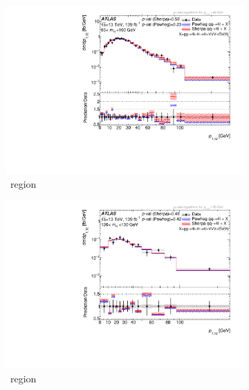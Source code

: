 \begin{figure}[H]
    \begin{subfigure}{.49\textwidth}\centering
      \includegraphics[width=.95\linewidth]{Figures/m4l/UnfoldedResults/linlog_Unfolded_Data_pt12_m4l60-100.pdf}\caption{\ZFourL \ region}\label{fig:sub-first}
    \end{subfigure}
    \begin{subfigure}{.49\textwidth}\centering
      \includegraphics[width=.95\linewidth]{Figures/m4l/UnfoldedResults/linlog_Unfolded_Data_pt12_m4l120-130.pdf} \caption{\HFourL \ region}\label{fig:sub-second}
    \end{subfigure}
    \begin{subfigure}{.49\textwidth}\centering

\end{subfigure}
\end{figure}
